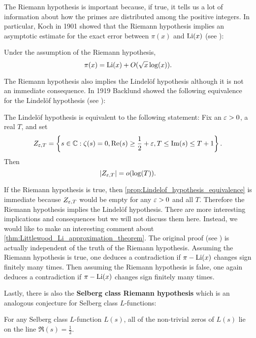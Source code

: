       The Riemann hypothesis is important because, if true, it tells us a lot of information about how the primes are distributed among the positive integers. In particular, Koch in 1901 showed that the Riemann hypothesis implies an asymptotic estimate for the exact error between $\pi(x)$ and $\operatorname{\mathrm{Li}}(x)$ (see \cite{von1901distribution}):

      \begin{proposition}
        Under the assumption of the Riemann hypothesis,
        \[
          \pi(x) = \operatorname{\mathrm{Li}}(x)+O(\sqrt{x}\log(x)).
        \]
      \end{proposition}

      The Riemann hypothesis also implies the Lindel\"of hypothesis although it is not an immediate consequence. In 1919 Backlund showed the following equivalence for the Lindel\"of hypothesis (see \cite{backlund1919beziehung}):

      \begin{proposition}\label{prop:Lindelof_hypothesis_equivalence}
      The Lindel\"of hypothesis is equivalent to the following statement: Fix an $\varepsilon > 0$, a real $T$, and set
      \[
        Z_{\varepsilon,T} = \left\{s \in \mathbb{C} : \zeta(s) = 0, \mathrm{Re}(s) \ge \frac{1}{2}+\varepsilon, T \le \mathrm{Im}(s) \le T+1 \right\}.
      \]
      Then
      \[
        |Z_{\varepsilon,T}| = o(\log(T)).
      \]
      \end{proposition}

      If the Riemann hypothesis is true, then \cref{prop:Lindelof_hypothesis_equivalence} is immediate because $Z_{\varepsilon,T}$ would be empty for any $\varepsilon > 0$ and all $T$. Therefore the Riemann hypothesis implies the Lindel\"of hypothesis. There are more interesting implications and consequences but we will not discuss them here. Instead, we would like to make an interesting comment about \cref{thm:Littlewood_Li_approximation_theorem}. The original proof (see \cite{hardy1916contributions}) is actually independent of the truth of the Riemann hypothesis. Assuming the Riemann hypothesis is true, one deduces a contradiction if $\pi-\operatorname{\mathrm{Li}}(x)$ changes sign finitely many times. Then assuming the Riemann hypothesis is false, one again deduces a contradiction if $\pi-\operatorname{\mathrm{Li}}(x)$ changes sign finitely many times.

      Lastly, there is also the \textbf{Selberg class Riemann hypothesis} which is an analogous conjecture for Selberg class $L$-functions:

      \begin{conjecture}
        For any Selberg class $L$-function $L(s)$, all of the non-trivial zeros of $L(s)$ lie on the line $\Re(s) = \frac{1}{2}$.
      \end{conjecture}

